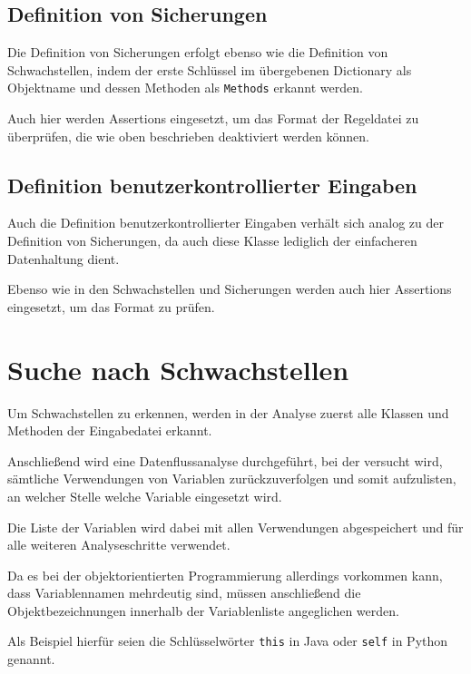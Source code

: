         \subsection{Definition von Sicherungen}
            Die Definition von Sicherungen erfolgt ebenso wie die Definition von Schwachstellen,
            indem der erste Schlüssel im übergebenen Dictionary als Objektname und
            dessen Methoden als
            \lstinline{Methods} erkannt werden.

            Auch hier werden Assertions eingesetzt,
            um das Format der Regeldatei zu überprüfen,
            die wie oben beschrieben deaktiviert werden können.

        \subsection{Definition benutzerkontrollierter Eingaben}
            Auch die Definition benutzerkontrollierter Eingaben verhält sich analog zu der Definition von Sicherungen,
            da auch diese Klasse lediglich der einfacheren Datenhaltung dient.

            Ebenso wie in den Schwachstellen und
            Sicherungen werden auch hier Assertions eingesetzt,
            um das Format zu prüfen.

    \section{Suche nach Schwachstellen}\label{Suche nach Schwachstellen}
        Um Schwachstellen zu erkennen,
        werden in der Analyse zuerst alle Klassen und
        Methoden der Eingabedatei erkannt.

        Anschließend wird eine Datenflussanalyse durchgeführt,
        bei der versucht wird,
        sämtliche Verwendungen von Variablen zurückzuverfolgen und
        somit aufzulisten,
        an welcher Stelle welche Variable eingesetzt wird.

        Die Liste der Variablen wird dabei mit allen Verwendungen abgespeichert und
        für alle weiteren Analyseschritte verwendet.

        Da es bei der objektorientierten Programmierung allerdings vorkommen kann,
        dass Variablennamen mehrdeutig sind,
        müssen anschließend die Objektbezeichnungen innerhalb der Variablenliste angeglichen werden.

        Als Beispiel hierfür seien die Schlüsselwörter
        \lstinline{this} in Java oder
        \lstinline{self} in Python genannt.

